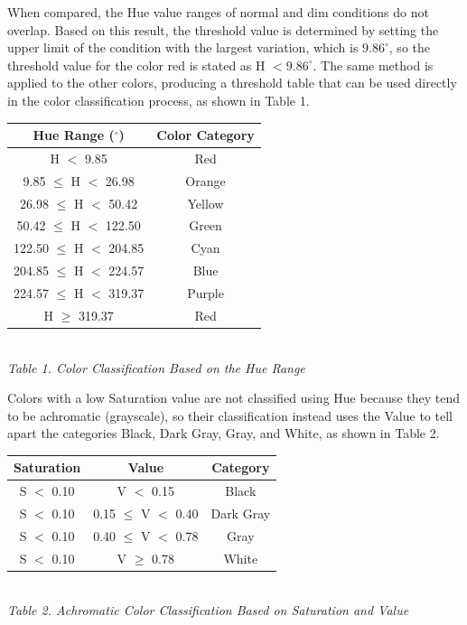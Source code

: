 When compared, the Hue value ranges of normal and dim conditions do not overlap. Based on this result, the threshold value is determined by setting the upper limit of the condition with the largest variation, which is $9.86^\circ$, so the threshold value for the color red is stated as H $< 9.86^\circ$. The same method is applied to the other colors, producing a threshold table that can be used directly in the color classification process, as shown in Table 1.

\begin{table}[H]
  \centering
  {\footnotesize
  \begin{tabular}{|c|c|}
    \hline
    \textbf{Hue Range ($^\circ$)} & \textbf{Color Category} \\
    \hline
    H $<$ 9.85 & Red \\ \hline
    9.85 $\leq$ H $<$ 26.98 & Orange \\ \hline
    26.98 $\leq$ H $<$ 50.42 & Yellow \\ \hline
    50.42 $\leq$ H $<$ 122.50 & Green \\ \hline
    122.50 $\leq$ H $<$ 204.85 & Cyan \\ \hline
    204.85 $\leq$ H $<$ 224.57 & Blue \\ \hline
    224.57 $\leq$ H $<$ 319.37 & Purple \\ \hline
    H $\geq$ 319.37 & Red \\ \hline
  \end{tabular}}\\[0.3em]
  {\footnotesize\textit{Table 1. Color Classification Based on the Hue Range}}
\end{table}

Colors with a low Saturation value are not classified using Hue because they tend to be achromatic (grayscale), so their classification instead uses the Value to tell apart the categories Black, Dark Gray, Gray, and White, as shown in Table 2.

\begin{table}[H]
  \centering
  {\footnotesize
  \begin{tabular}{|c|c|c|}
    \hline
    \textbf{Saturation} & \textbf{Value} & \textbf{Category} \\
    \hline
    S $<$ 0.10 & V $<$ 0.15 & Black \\ \hline
    S $<$ 0.10 & 0.15 $\leq$ V $<$ 0.40 & Dark Gray \\ \hline
    S $<$ 0.10 & 0.40 $\leq$ V $<$ 0.78 & Gray \\ \hline
    S $<$ 0.10 & V $\geq$ 0.78 & White \\ \hline
  \end{tabular}}\\[0.3em]
  {\footnotesize\textit{Table 2. Achromatic Color Classification Based on Saturation and Value}}
\end{table}

